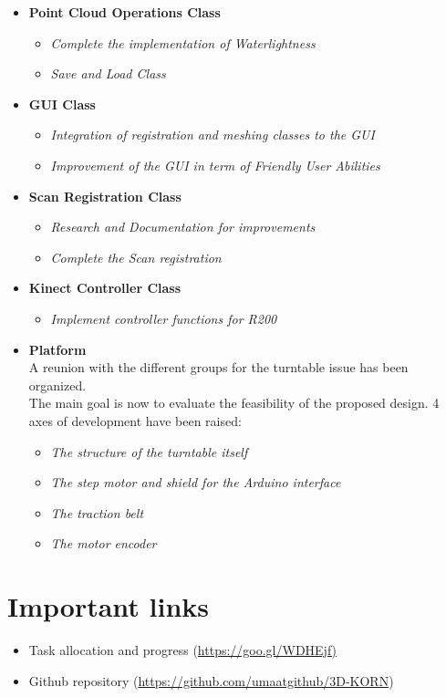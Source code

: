 \documentclass[11pt]{article} %
\begin{document}
\begin{itemize}

\item \textbf{Point Cloud Operations Class}
\begin{itemize}
\item \textit{Complete the implementation of Waterlightness}
\item \textit{Save and Load Class}
\end{itemize}

\item \textbf{GUI Class}
\begin{itemize}
\item \textit{Integration of registration and meshing classes to the GUI}
\item \textit{Improvement of the GUI in term of Friendly User Abilities}
\end{itemize}

\item \textbf{Scan Registration Class}
\begin{itemize}
\item \textit{Research and Documentation for improvements}
\item \textit{Complete the Scan registration}
\end{itemize}

\item \textbf{Kinect Controller Class}
\begin{itemize}
\item \textit{Implement controller functions for R200}
\end{itemize}

\item \textbf{Platform}\\
A reunion with the different groups for the turntable issue has been organized.\\
The main goal is now to evaluate the feasibility of the proposed design. 4 axes of development have been raised:
\begin{itemize}
\item \textit{The structure of the turntable itself}
\item \textit{The step motor and shield for the Arduino interface}
\item \textit{The traction belt}
\item \textit{The motor encoder}
\end{itemize}


\end{itemize}

\section{Important links}
\begin{itemize}
\item Task allocation and progress  (\url{https://goo.gl/WDHEjf)}
\item Github repository (\url{https://github.com/umaatgithub/3D-KORN})
\end{itemize}
\end{document}
